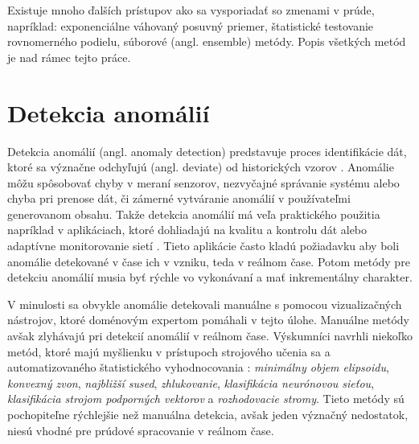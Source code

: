 \par
Existuje mnoho ďalších prístupov ako sa vysporiadať so zmenami v prúde, napríklad: exponenciálne váhovaný posuvný priemer, štatistické testovanie rovnomerného podielu, súborové (angl. ensemble) metódy. Popis všetkých metód je nad rámec tejto práce.



\section{Detekcia anomálií}
Detekcia anomálií (angl. anomaly detection) predstavuje proces identifikácie dát, ktoré sa význačne odchyľujú (angl. deviate) od historických vzorov \citep{hodge2004survey}. Anomálie môžu spôsobovať chyby v meraní senzorov, nezvyčajné správanie systému alebo chyba pri prenose dát, či zámerné vytváranie anomálií v používateľmi generovanom obsahu. 
Takže detekcia anomálií má veľa praktického použitia napríklad v aplikáciach, ktoré dohliadajú na kvalitu a kontrolu dát \citep{hill2007real} alebo adaptívne monitorovanie sietí  \citep{hill2010anomaly}. Tieto aplikácie často kladú požiadavku aby boli anomálie detekované v čase ich v vzniku, teda v reálnom čase. Potom metódy pre detekciu anomálií musia byť rýchle vo vykonávaní a mať inkrementálny charakter. \par

V minulosti sa obvykle anomálie detekovali manuálne s pomocou vizualizačných nástrojov, ktoré doménovým expertom pomáhali v tejto úlohe. Manuálne metódy avšak zlyhávajú pri detekcií anomálií v reálnom čase. Výskumníci navrhli niekoľko metód, ktoré majú myšlienku v prístupoch strojového učenia sa a automatizovaného štatistického vyhodnocovania \citep{hill2010anomaly}: \textit{minimálny objem elipsoidu}, \textit{konvexný zvon}, \textit{najbližší sused}, \textit{zhlukovanie}, \textit{klasifikácia neurónovou sieťou}, \textit{klasifikácia strojom podporných vektorov} a \textit{rozhodovacie stromy}. Tieto metódy sú pochopiteľne rýchlejšie než manuálna detekcia, avšak jeden význačný nedostatok, niesú vhodné pre prúdové spracovanie v reálnom čase.

